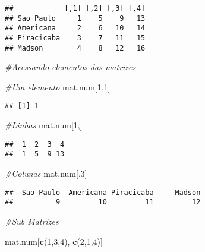 \documentclass[]{article}
\newenvironment{Shaded}{\begin{snugshade}}{\end{snugshade}}
\newcommand{\KeywordTok}[1]{\textcolor[rgb]{0.13,0.29,0.53}{\textbf{#1}}}
\newcommand{\DecValTok}[1]{\textcolor[rgb]{0.00,0.00,0.81}{#1}}
\newcommand{\CommentTok}[1]{\textcolor[rgb]{0.56,0.35,0.01}{\textit{#1}}}
\newcommand{\OperatorTok}[1]{\textcolor[rgb]{0.81,0.36,0.00}{\textbf{#1}}}
\newcommand{\NormalTok}[1]{#1}
\begin{document}
\begin{Shaded}
\end{Shaded}

\begin{verbatim}
##            [,1] [,2] [,3] [,4]
## Sao Paulo     1    5    9   13
## Americana     2    6   10   14
## Piracicaba    3    7   11   15
## Madson        4    8   12   16
\end{verbatim}

\begin{Shaded}
\begin{Highlighting}[]
\CommentTok{#Acessando elementos das matrizes }

\CommentTok{#Um elemento}
\NormalTok{mat.num[}\DecValTok{1}\NormalTok{,}\DecValTok{1}\NormalTok{]}
\end{Highlighting}
\end{Shaded}

\begin{verbatim}
## [1] 1
\end{verbatim}

\begin{Shaded}
\begin{Highlighting}[]
\CommentTok{#Linhas }
\NormalTok{mat.num[}\DecValTok{1}\NormalTok{,]}
\end{Highlighting}
\end{Shaded}

\begin{verbatim}
##  1  2  3  4 
##  1  5  9 13
\end{verbatim}

\begin{Shaded}
\begin{Highlighting}[]
\CommentTok{#Colunas}
\NormalTok{mat.num[,}\DecValTok{3}\NormalTok{]}
\end{Highlighting}
\end{Shaded}

\begin{verbatim}
##  Sao Paulo  Americana Piracicaba     Madson 
##          9         10         11         12
\end{verbatim}

\begin{Shaded}
\begin{Highlighting}[]
\CommentTok{#Sub Matrizes}

\NormalTok{mat.num[}\KeywordTok{c}\NormalTok{(}\DecValTok{1}\NormalTok{,}\DecValTok{3}\NormalTok{,}\DecValTok{4}\NormalTok{), }\KeywordTok{c}\NormalTok{(}\DecValTok{2}\NormalTok{,}\DecValTok{1}\NormalTok{,}\DecValTok{4}\NormalTok{)]}
\end{Highlighting}
\end{Shaded}
\end{document}

